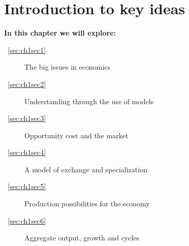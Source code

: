 \chapter{Introduction to key ideas} \label{chap:intro}

\begin{topics}
\textbf{In this chapter we will explore:}
\begin{description}
\item [~\ref{sec:ch1sec1}] The big issues in economics
\item [~\ref{sec:ch1sec2}] Understanding through the use of models
\item [~\ref{sec:ch1sec3}] Opportunity cost and the market
\item [~\ref{sec:ch1sec4}] A model of exchange and specialization
\item [~\ref{sec:ch1sec5}] Production possibilities for the economy
\item [~\ref{sec:ch1sec6}] Aggregate output, growth and cycles
\end{description}
\end{topics}